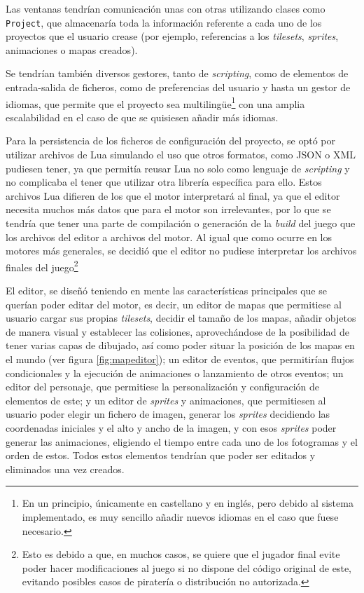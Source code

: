 \medskip

Las ventanas tendrían comunicación unas con otras utilizando clases como \texttt{Project}, que almacenaría toda la información referente a cada uno de los proyectos que el usuario crease (por ejemplo, referencias a los \textit{tilesets}, \textit{sprites}, animaciones o mapas creados).

\smallskip

Se tendrían también diversos gestores, tanto de \textit{scripting}, como de elementos de entrada-salida de ficheros, como de preferencias del usuario y hasta un gestor de idiomas, que permite que el proyecto sea multilingüe\footnote{En un principio, únicamente en castellano y en inglés, pero debido al sistema implementado, es muy sencillo añadir nuevos idiomas en el caso que fuese necesario.} con una amplia escalabilidad en el caso de que se quisiesen añadir más idiomas.

\medskip

Para la persistencia de los ficheros de configuración del proyecto, se optó por utilizar archivos de Lua simulando el uso que otros formatos, como JSON o XML pudiesen tener, ya que permitía reusar Lua no solo como lenguaje de \textit{scripting} y no complicaba el tener que utilizar otra librería específica para ello. Estos archivos Lua difieren de los que el motor interpretará al final, ya que el editor necesita muchos más datos que para el motor son irrelevantes, por lo que se tendría que tener una parte de compilación o generación de la \textit{build} del juego que  los archivos del editor a archivos del motor. Al igual que como ocurre en los motores más generales, se decidió que el editor no pudiese interpretar los archivos finales del juego\footnote{Esto es debido a que, en muchos casos, se quiere que el jugador final evite poder hacer modificaciones al juego si no dispone del código original de este, evitando posibles casos de piratería o distribución no autorizada.}

\bigskip


El editor, se diseñó teniendo en mente las características principales que se querían poder editar del motor, es decir, un editor de mapas que permitiese al usuario cargar sus propias \textit{tilesets}, decidir el tamaño de los mapas, añadir objetos de manera visual y establecer las colisiones, aprovechándose de la posibilidad de tener varias capas de dibujado, así como poder situar la posición de los mapas en el mundo (ver figura \ref{fig:mapeditor}); un editor de eventos, que permitirían flujos condicionales y la ejecución de animaciones o lanzamiento de otros eventos; un editor del personaje, que permitiese la personalización y configuración de elementos de este; y un editor de \textit{sprites} y animaciones, que permitiesen al usuario poder elegir un fichero de imagen, generar los \textit{sprites} decidiendo las coordenadas iniciales y el alto y ancho de la imagen, y con esos \textit{sprites} poder generar las animaciones, eligiendo el tiempo entre cada uno de los fotogramas y el orden de estos. Todos estos elementos tendrían que poder ser editados y eliminados una vez creados.

